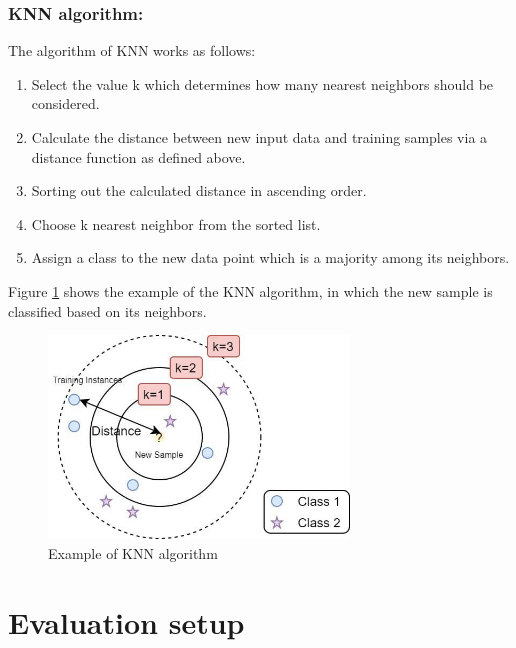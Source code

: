 \subsubsection*{KNN algorithm:}
The algorithm of KNN works as follows:
\begin{enumerate}
    \item Select the value k which determines how many nearest neighbors should be considered.
    \vspace*{-3mm}
    \item Calculate the distance between new input data and training samples via a distance function as defined above.
    \vspace*{-3mm}
    \item Sorting out the calculated distance in ascending order.
    \vspace*{-3mm}
    \item Choose k nearest neighbor from the sorted list.
    \vspace*{-3mm}
    \item Assign a class to the new data point which is a majority among its neighbors.
    \vspace*{-3mm}
\end{enumerate}
Figure \ref{fig:Example of KNN algorithm} shows the example of the KNN algorithm, in which the new sample is classified based on its neighbors. 


\begin{figure}[H]
	\centering
	\includegraphics[width=8cm]{gfx/KNN.png}
    \captionsetup{justification=centering}
	\caption{Example of KNN algorithm}
	\label{fig:Example of KNN algorithm}
\end{figure}



\section{Evaluation setup}

\label{sec:system:sec5}

